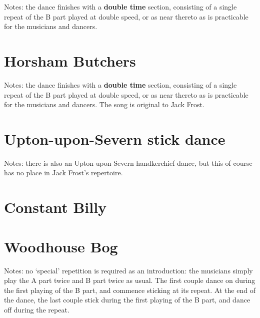 \documentclass[12pt,a4paper]{article}
\begin{document}

\noindent Notes: the dance finishes with a {\bf double time} section,
consisting of a single repeat of the B part played at double
speed, or as near thereto as is practicable for the musicians
and dancers.

\pagebreak[2]

\section{Horsham Butchers}


\noindent Notes: the dance finishes with a {\bf double time} section,
consisting of a single repeat of the B part played at double
speed, or as near thereto as is practicable for the musicians
and dancers. The song is original to Jack Frost.

\pagebreak[2]

\section{Upton-upon-Severn stick dance}


\noindent Notes: there is also an Upton-upon-Severn handkerchief dance, but 
this of course has no place in Jack Frost's repertoire.

\pagebreak[2]

\section{Constant Billy}


\pagebreak[4]

\section{Woodhouse Bog}


\noindent Notes: no `special' repetition is required as an
introduction: the musicians simply play the A part twice and B part
twice as usual. The first couple dance on during the first playing of
the B part, and commence sticking at its repeat. At the end of
the dance, the last couple stick during the first playing of the B
part, and dance off during the repeat.
\end{document}
